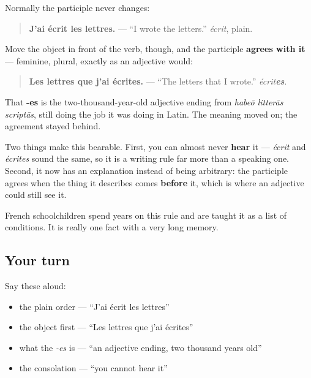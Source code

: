 \begin{grammarlens}[title={Grammar Lens: the participle still agrees, when the object goes first}]
Normally the participle never changes:

\begin{quote}
\textbf{J'ai écrit les lettres.} — \textquotedblleft{}I wrote the letters.\textquotedblright{} \emph{écrit}, plain.
\end{quote}

Move the object in front of the verb, though, and the participle \textbf{agrees with it} — feminine, plural, exactly as an adjective would:

\begin{quote}
\textbf{Les lettres que j'ai écrites.} — \textquotedblleft{}The letters that I wrote.\textquotedblright{} \emph{écrit\textbf{es}}.
\end{quote}

That \textbf{-es} is the two-thousand-year-old adjective ending from \emph{habeō litterās scriptās}, still doing the job it was doing in Latin. The meaning moved on; the agreement stayed behind.

Two things make this bearable. First, you can almost never \textbf{hear} it — \emph{écrit} and \emph{écrites} sound the same, so it is a writing rule far more than a speaking one. Second, it now has an explanation instead of being arbitrary: the participle agrees when the thing it describes comes \textbf{before} it, which is where an adjective could still see it.

French schoolchildren spend years on this rule and are taught it as a list of conditions. It is really one fact with a very long memory.
\end{grammarlens}

\subsection*{Your turn}
Say these aloud:

\begin{itemize}
\raggedright
  \item the plain order — \textquotedblleft{}J'ai écrit les lettres\textquotedblright{}
  \item the object first — \textquotedblleft{}Les lettres que j'ai écrites\textquotedblright{}
  \item what the \emph{-es} is — \textquotedblleft{}an adjective ending, two thousand years old\textquotedblright{}
  \item the consolation — \textquotedblleft{}you cannot hear it\textquotedblright{}
\end{itemize}

